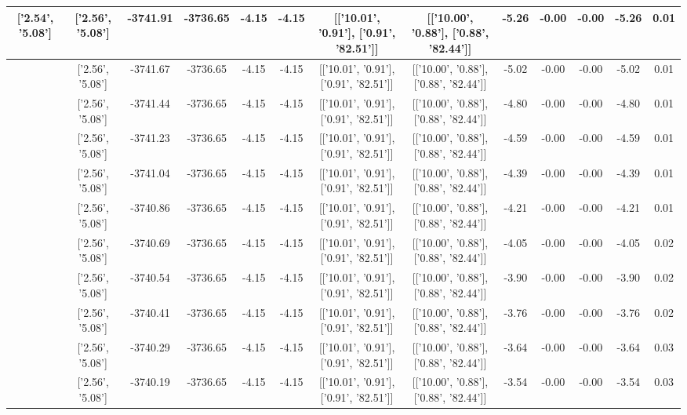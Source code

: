 \begin{table}[htbp]
\begin{adjustbox}{angle=90}
\begin{tabular}{|c|c|c|c|c|c|c|c|c|c|c|c|c|}
 ['2.54', '5.08'] & ['2.56', '5.08'] & -3741.91 & -3736.65 & -4.15 & -4.15 & [['10.01', '0.91'], ['0.91', '82.51']] & [['10.00', '0.88'], ['0.88', '82.44']] & -5.26 & -0.00 & -0.00 & -5.26 & 0.01\\ \hline
 ['2.54', '5.08'] & ['2.56', '5.08'] & -3741.67 & -3736.65 & -4.15 & -4.15 & [['10.01', '0.91'], ['0.91', '82.51']] & [['10.00', '0.88'], ['0.88', '82.44']] & -5.02 & -0.00 & -0.00 & -5.02 & 0.01\\ \hline
 ['2.55', '5.08'] & ['2.56', '5.08'] & -3741.44 & -3736.65 & -4.15 & -4.15 & [['10.01', '0.91'], ['0.91', '82.51']] & [['10.00', '0.88'], ['0.88', '82.44']] & -4.80 & -0.00 & -0.00 & -4.80 & 0.01\\ \hline
 ['2.55', '5.08'] & ['2.56', '5.08'] & -3741.23 & -3736.65 & -4.15 & -4.15 & [['10.01', '0.91'], ['0.91', '82.51']] & [['10.00', '0.88'], ['0.88', '82.44']] & -4.59 & -0.00 & -0.00 & -4.59 & 0.01\\ \hline
 ['2.55', '5.08'] & ['2.56', '5.08'] & -3741.04 & -3736.65 & -4.15 & -4.15 & [['10.01', '0.91'], ['0.91', '82.51']] & [['10.00', '0.88'], ['0.88', '82.44']] & -4.39 & -0.00 & -0.00 & -4.39 & 0.01\\ \hline
 ['2.55', '5.08'] & ['2.56', '5.08'] & -3740.86 & -3736.65 & -4.15 & -4.15 & [['10.01', '0.91'], ['0.91', '82.51']] & [['10.00', '0.88'], ['0.88', '82.44']] & -4.21 & -0.00 & -0.00 & -4.21 & 0.01\\ \hline
 ['2.55', '5.08'] & ['2.56', '5.08'] & -3740.69 & -3736.65 & -4.15 & -4.15 & [['10.01', '0.91'], ['0.91', '82.51']] & [['10.00', '0.88'], ['0.88', '82.44']] & -4.05 & -0.00 & -0.00 & -4.05 & 0.02\\ \hline
 ['2.55', '5.08'] & ['2.56', '5.08'] & -3740.54 & -3736.65 & -4.15 & -4.15 & [['10.01', '0.91'], ['0.91', '82.51']] & [['10.00', '0.88'], ['0.88', '82.44']] & -3.90 & -0.00 & -0.00 & -3.90 & 0.02\\ \hline
 ['2.55', '5.08'] & ['2.56', '5.08'] & -3740.41 & -3736.65 & -4.15 & -4.15 & [['10.01', '0.91'], ['0.91', '82.51']] & [['10.00', '0.88'], ['0.88', '82.44']] & -3.76 & -0.00 & -0.00 & -3.76 & 0.02\\ \hline
 ['2.55', '5.08'] & ['2.56', '5.08'] & -3740.29 & -3736.65 & -4.15 & -4.15 & [['10.01', '0.91'], ['0.91', '82.51']] & [['10.00', '0.88'], ['0.88', '82.44']] & -3.64 & -0.00 & -0.00 & -3.64 & 0.03\\ \hline
 ['2.56', '5.08'] & ['2.56', '5.08'] & -3740.19 & -3736.65 & -4.15 & -4.15 & [['10.01', '0.91'], ['0.91', '82.51']] & [['10.00', '0.88'], ['0.88', '82.44']] & -3.54 & -0.00 & -0.00 & -3.54 & 0.03\\ \hline

\end{tabular}
\end{adjustbox}
\end{table}
